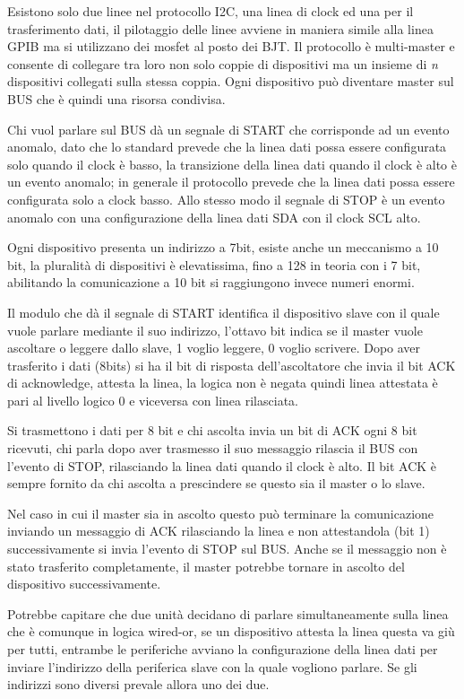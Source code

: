 Esistono solo due linee nel protocollo I2C, una linea di clock ed una per il
trasferimento dati, il pilotaggio delle linee avviene in maniera simile alla
linea GPIB ma si utilizzano dei mosfet al posto dei BJT.
Il protocollo è multi-master e consente di collegare tra loro non solo coppie di
dispositivi ma un insieme di \textit{n} dispositivi collegati sulla stessa
coppia.
Ogni dispositivo può diventare master sul BUS che è quindi una risorsa
condivisa.

Chi vuol parlare sul BUS dà un segnale di START che corrisponde ad un evento
anomalo, dato che lo standard prevede che la linea dati possa essere
configurata solo quando il clock è basso, la transizione della linea dati
quando il clock è alto è un evento anomalo; in generale il protocollo prevede
che la linea dati possa essere configurata solo a clock basso. Allo stesso modo
il segnale di STOP è un evento anomalo con una configurazione della linea dati
SDA con il clock SCL alto.

Ogni dispositivo presenta un indirizzo a 7bit, esiste anche un meccanismo a 10
bit, la pluralità di dispositivi è elevatissima, fino a 128 in teoria con i 7
bit, abilitando la comunicazione a 10 bit si raggiungono invece numeri enormi.

Il modulo che dà il segnale di START identifica il dispositivo slave con il
quale vuole parlare mediante il suo indirizzo, l'ottavo bit indica se il master
vuole ascoltare o leggere dallo slave, 1 voglio leggere, 0 voglio scrivere.
Dopo aver trasferito i dati (8bits) si ha il bit di risposta dell'ascoltatore
che invia il bit ACK di acknowledge, attesta la linea, la
logica non è negata quindi linea attestata è pari al livello logico 0 e
viceversa con linea rilasciata.

Si trasmettono i dati per 8 bit e chi ascolta invia un bit di ACK ogni 8 bit
ricevuti, chi parla dopo aver trasmesso il suo messaggio rilascia il BUS con
l'evento di STOP, rilasciando la linea dati quando il clock è alto.
Il bit ACK è sempre fornito da chi ascolta a prescindere se questo sia il
master o lo slave.

Nel caso in cui il master sia in ascolto questo può terminare la comunicazione
inviando un messaggio di ACK rilasciando la linea e non attestandola (bit 1)
successivamente si invia l'evento di STOP sul BUS.
Anche se il messaggio non è stato trasferito completamente, il master potrebbe
tornare in ascolto del dispositivo successivamente.

Potrebbe capitare che due unità decidano di parlare simultaneamente sulla linea
che è comunque in logica wired-or, se un dispositivo attesta la linea questa va
giù per tutti, entrambe le periferiche avviano la configurazione della linea
dati per inviare l'indirizzo della periferica slave con la quale vogliono
parlare. Se gli indirizzi sono diversi prevale allora uno dei due.

